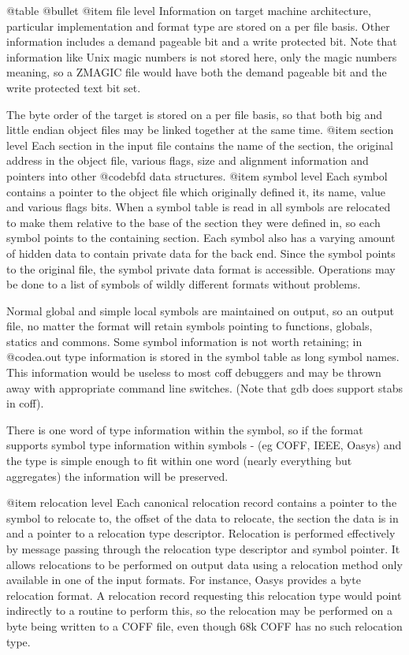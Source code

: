 @table @bullet 
@item file level Information on target machine
architecture, particular implementation and format type are stored on
a per file basis. Other information includes a demand pageable bit and
a write protected bit.  Note that information like Unix magic numbers
is not stored here, only the magic numbers meaning, so a ZMAGIC file
would have both the demand pageable bit and the write protected text
bit set.

The byte order of the target is stored on a per file basis, so that
both big and little endian object files may be linked together at the
same time.
@item section level
Each section in the input file contains the name of the section, the
original address in the object file, various flags, size and alignment
information and pointers into other @code{bfd} data structures.
@item symbol level
Each symbol contains a pointer to the object file which originally
defined it, its name, value and various flags bits. When a symbol
table is read in all symbols are relocated to make them relative to
the base of the section they were defined in, so each symbol points to
the containing section. Each symbol also has a varying amount of
hidden data to contain private data for the back end. Since the symbol
points to the original file, the symbol private data format is
accessible. Operations may be done to a list of symbols of wildly
different formats without problems.

Normal global and simple local symbols are maintained on output, so an
output file, no matter the format will retain symbols pointing to
functions, globals, statics and commons.  Some symbol information is
not worth retaining; in @code{a.out} type information is stored in the
symbol table as long symbol names. This information would be useless
to most coff debuggers and may be thrown away with appropriate command
line switches. (Note that gdb does support stabs in coff).

There is one word of type information within the symbol, so if the
format supports symbol type information within symbols - (eg COFF,
IEEE, Oasys) and the type is simple enough to fit within one word
(nearly everything but aggregates) the information will be preserved.

@item relocation level
Each canonical relocation record contains a pointer to the symbol to
relocate to, the offset of the data to relocate, the section the data
is in and a pointer to a relocation type descriptor. Relocation is
performed effectively by message passing through the relocation type
descriptor and symbol pointer. It allows relocations to be performed
on output data using a relocation method only available in one of the
input formats. For instance, Oasys provides a byte relocation format.
A relocation record requesting this relocation type would point
indirectly to a routine to perform this, so the relocation may be
performed on a byte being written to a COFF file, even though 68k COFF
has no such relocation type.

